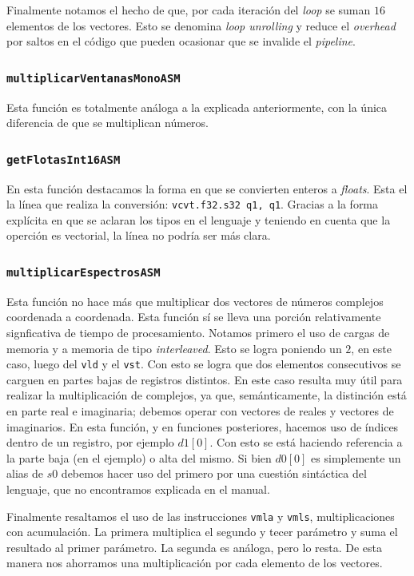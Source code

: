 \documentclass[%
    compressed,
    titlepage,
    narroweqnarray,
    inline,
    twoside,
    ]{ieee}
\begin{document}
Finalmente notamos el hecho de que, por cada iteraci\'on del \textit{loop} se suman $16$ elementos de los vectores. Esto se denomina \textit{loop unrolling}
y reduce el \textit{overhead} por saltos en el c\'odigo que pueden ocasionar que se invalide el \textit{pipeline}.

\subsubsection{\texttt{multiplicarVentanasMonoASM}}
Esta funci\'on es totalmente an\'aloga a la explicada anteriormente, con la \'unica diferencia de que se multiplican n\'umeros.

\subsubsection{\texttt{getFlotasInt16ASM}}
En esta funci\'on destacamos la forma en que se convierten enteros a \textit{floats}.
Esta el la l\'inea que realiza la conversi\'on: \texttt{vcvt.f32.s32 q1, q1}. Gracias a la forma expl\'icita en que se aclaran los tipos en el lenguaje y
teniendo en cuenta que la operci\'on es vectorial, la l\'inea no podr\'ia ser m\'as clara.

\subsubsection{\texttt{multiplicarEspectrosASM}}
Esta funci\'on no hace m\'as que multiplicar dos vectores de n\'umeros complejos coordenada a coordenada.
Esta funci\'on s\'i se lleva una porci\'on relativamente signficativa de tiempo de procesamiento.
Notamos primero el uso de cargas de memoria y a memoria de tipo \textit{interleaved}. Esto se logra poniendo un $2$, en este caso, luego del \texttt{vld}
y el \texttt{vst}. Con esto se logra que dos elementos consecutivos se carguen en partes bajas de registros distintos. En este caso resulta muy \'util
para realizar la multiplicaci\'on de complejos, ya que, sem\'anticamente, la distinci\'on est\'a en parte real e imaginaria; debemos operar con vectores de
reales y vectores de imaginarios. En esta funci\'on, y en funciones posteriores, hacemos uso de \'indices dentro de un registro, por ejemplo $d1[0]$. Con
esto se est\'a haciendo referencia a la parte baja (en el ejemplo) o alta del mismo. Si bien $d0[0]$ es simplemente un alias de $s0$ debemos hacer uso
del primero por una cuesti\'on sint\'actica del lenguaje, que no encontramos explicada en el manual.

Finalmente resaltamos el uso de las instrucciones \texttt{vmla} y \texttt{vmls}, multiplicaciones con acumulaci\'on. La primera multiplica el segundo
y tecer par\'ametro y suma el resultado al primer par\'ametro. La segunda es an\'aloga, pero lo resta.
De esta manera nos ahorramos una multiplicaci\'on por cada elemento de los vectores.%
\end{document}
